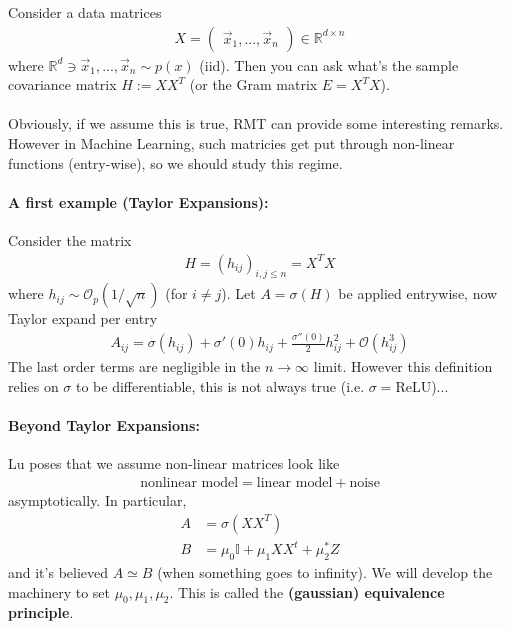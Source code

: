 Consider a data matrices 
\begin{align}
	X =\begin{pmatrix}
		 \vec x_1, ..., \vec x_n
	\end{pmatrix} \in \mathbb R^{d \times n}
\end{align}
where $\mathbb R^d\ni \vec x_1, ..., \vec x_n \sim p(x)$ (iid). Then you can ask what's the sample covariance matrix $H := XX^T$ (or the Gram matrix $E = X^TX$).\\
\\
Obviously, if we assume this is true, RMT can provide some interesting remarks. However in Machine Learning, such matricies get put through non-linear functions (entry-wise), so we should study this regime.


\paragraph{A first example (Taylor Expansions):}Consider the matrix
\begin{align}
	H = (h_{ij})_{i,j \leq n} = X^TX
\end{align}
where $h_{ij} \sim \mathcal O_p(1/\sqrt{n})$ (for $i \neq j$). Let $A  =\sigma(H)$ be applied entrywise, now Taylor expand per entry
\begin{align}
	A_{ij} = \sigma(h_{ij}) + \sigma'(0) h_{ij} + \frac{\sigma''(0)}{2	}h^2_{ij} + \mathcal O(h^3_{ij})
\end{align}
The last order terms are negligible in the $n \to \infty$ limit. However this definition relies on $\sigma$ to be differentiable, this is not always true (i.e. $\sigma = \text{ReLU}$)... 


\paragraph{Beyond Taylor Expansions:}Lu poses that we assume non-linear matrices look like
\begin{align}
	\text{nonlinear model} = \text{linear model} + \text{noise}
\end{align}
asymptotically. In particular,
\begin{align}
	A & = \sigma(XX^T)\\
	B & = \mu_0 \mathbb I + \mu_1 XX^t + \mu_2^* Z
\end{align}
and it's believed $A \simeq B$ (when something goes to infinity). We will develop the machinery to set $\mu_0, \mu_1, \mu_2$. This is called the \textbf{(gaussian) equivalence principle}.

